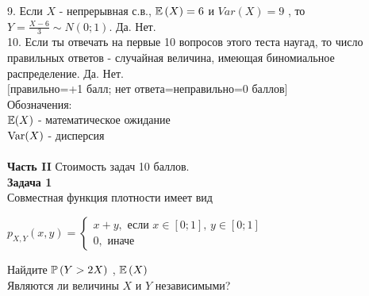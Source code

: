 \documentclass[12pt, a4paper]{article}\usepackage[]{graphicx}\usepackage[]{color}
\begin{document}
9. Если  $X$  - непрерывная с.в.,  $\E\left(X\right)=6$  и
$Var\left(X\right)=9$ , то  $Y=\frac{X-6}{3} \sim
N\left(0;1\right)$.  Да. Нет. \\

10. Если ты отвечать на первые 10 вопросов этого теста наугад, то
число правильных ответов - случайная величина, имеющая
биномиальное распределение. Да. Нет. \\



$[$правильно=+1 балл; нет ответа=неправильно=0 баллов$]$ \\
Обозначения: \\
$\E(X)$ - математическое ожидание \\
$\Var(X)$ - дисперсия \\ \\

\textbf{Часть II} Стоимость задач 10 баллов. \\





\textbf{Задача 1} \\ %
Совместная функция плотности имеет вид

$p_{X,Y} \left(x,y\right)=
\left\{
\begin{array}{l}
{x+y, \text{ если } x\in \left[0;1\right],\, y\in \left[0;1\right]} \\
{0,\text{ иначе} }
\end{array}\right. $

Найдите  $\P\left(Y>2X\right)$ ,  $\E\left(X\right)$ \\
Являются ли величины $X$ и $Y$ независимыми? \\
\end{document}
